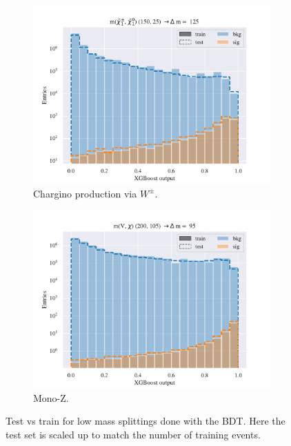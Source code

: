 \begin{figure}[H]
    \begin{subfigure}[t!]{0.49\textwidth}
        \includegraphics[width = \textwidth]{Figures/WW/BDT/All_level/Low/scaled_train_test_395268.pdf}
        \caption{Chargino production via $W^\pm$.}
        \label{fig:WWLow}
    \end{subfigure}
    \begin{subfigure}[t!]{0.49\textwidth}
        \includegraphics[width = \textwidth]{Figures/Mono_Z/ML/BDT/All_level/Low/scaled_train_test_310604.pdf}
        \caption{Mono-Z.}
        \label{fig:MonoZLow}
    \end{subfigure}
    \caption{Test vs train for low mass splittings done with the BDT. Here the test set is scaled up to match the number of training events.}
    \label{fig:AllLowBDT}
\end{figure}

